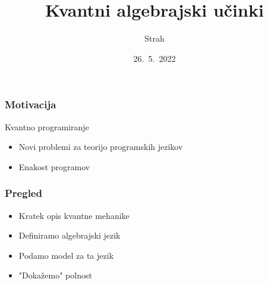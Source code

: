 \documentclass[handout, slovene]{beamer}
\title{Kvantni algebrajski učinki}
\author{Strah}
\institute{mentor: doc. dr. Matija Pretnar}
\date{26.~5.~2022}
\newcommand{\airquotes}[1]{"#1"}
\begin{document}
\frame{\titlepage}

\begin{frame}
    \frametitle{Motivacija}

    Kvantno programiranje
    \begin{itemize}
        \item Novi problemi za teorijo programskih jezikov
        \pause
        \item Enakost programov
    \end{itemize}


\end{frame}
\begin{frame}
    \frametitle{Pregled}

    \begin{itemize}
        \item Kratek opis kvantne mehanike
        \item Definiramo algebrajski jezik
        \item Podamo model za ta jezik
        \item \airquotes{Dokažemo} polnost
    \end{itemize}

\end{frame}
\end{document}
